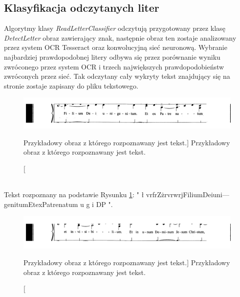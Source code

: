 \documentclass[a4paper,12pt]{article}
\newcommand\spacingIndent{2.2em}
\begin{document}
        \subsection{Klasyfikacja odczytanych liter}
	        \hspace{\spacingIndent} Algorytmy klasy \textit{ReadLetterClassifier} odczytują przygotowany     przez klasę \textit{DetectLetter} obraz zawierający znak, następnie obraz ten zostaje analizowany przez system OCR Tesseract oraz konwolucyjną sieć       neuronową. Wybranie najbardziej prawdopodobnej litery odbywa się przez      porównanie wyniku zwróconego przez system OCR i trzech największych         prawdopodobieństw zwróconych przez sieć. Tak odczytany cały wykryty         tekst znajdujący się na stronie zostaje zapisany do pliku tekstowego.
	        \begin{figure}[!ht]  
			        \begin{center}
				        \includegraphics[width = 16.5cm, frame] {image//exampleImage//r_001.png} 
			        \end{center}
			        \caption
        			    [Przykładowy obraz z którego rozpoznawany jest tekst.]  
        			    {Przykładowy obraz z którego rozpoznawany jest tekst.}  
        			    \label{fig:exImgRead01}
	        \end{figure}\\
	        Tekst rozpoznany na podstawie Rysunku \ref{fig:exImgRead01}: 
	        " ł vrfrZżrvrwrjFiliumDeiuni—genitumEtexPatrenatum        u g i  DP  ".
	        \begin{figure}[!ht]  
			        \begin{center}
				        \includegraphics[width = 16.5cm, frame] {image//exampleImage//r_002.png} 
			        \end{center}
			        \caption
        			    [Przykładowy obraz z którego rozpoznawany jest tekst.]  
        			    {Przykładowy obraz z którego rozpoznawany jest tekst.}  
        			    \label{fig:exImgRead02}
	        \end{figure}\\
\end{document}
